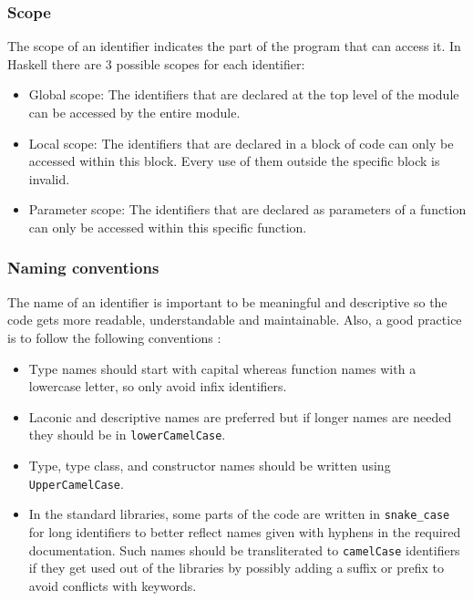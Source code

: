 \documentclass[a4paper, titlepage, twoside]{article}
\begin{document}
\subsubsection{Scope}
\label{sec:org88fa859}

The scope of an identifier indicates the part of the program that can access it. In Haskell there are 3 possible scopes for each identifier:

\begin{itemize}
\item Global scope: The identifiers that are declared at the top level of the module can be accessed by the entire module.

\item Local scope: The identifiers that are declared in a block of code can only be accessed within this block. Every use of them outside the specific block is invalid.

\item Parameter scope: The identifiers that are declared as parameters of a function can only be accessed within this specific function.
\end{itemize}

\subsubsection{Naming conventions}
\label{sec:org2c88beb}

The name of an identifier is important to be meaningful and descriptive so the code gets more readable, understandable and maintainable. Also, a good practice is to follow the following conventions \autocite{haskellwikiProgrammingGuidelinesHaskellWiki2022}:

\begin{itemize}
\item Type names should start with capital whereas function names with a lowercase letter, so only avoid infix identifiers.

\item Laconic and descriptive names are preferred but if longer names are needed they should be in \texttt{lowerCamelCase}.

\item Type, type class, and constructor names should be written using \texttt{UpperCamelCase}.

\item In the standard libraries, some parts of the code are written in \texttt{snake\_case} for long identifiers to better reflect names given with hyphens in the required documentation. Such names should be transliterated to \texttt{camelCase} identifiers if they get used out of the libraries by possibly adding a suffix or prefix to avoid conflicts with keywords.
\end{itemize}
\end{document}
